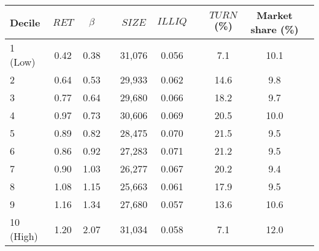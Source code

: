 \begin{tabular}{@{}lccccccccc@{}}
	\toprule
	Decile & $\textit{RET}$ & $\beta$ && $\textit{SIZE}$ & $\textit{ILLIQ}$ && $\textit{TURN}$ (\%) & Market share (\%) \\ \midrule
1 (Low) & 0.42 & 0.38 && 31,076 & 0.056 && 7.1 & 10.1 \\
2       & 0.64 & 0.53 && 29,933 & 0.062 && 14.6 & 9.8 \\
3       & 0.77 & 0.64 && 29,680 & 0.066 && 18.2 & 9.7 \\
4       & 0.97 & 0.73 && 30,606 & 0.069 && 20.5 & 10.0 \\
5       & 0.89 & 0.82 && 28,475 & 0.070 && 21.5 & 9.5 \\
6       & 0.86 & 0.92 && 27,283 & 0.071 && 21.2 & 9.5 \\
7       & 0.90 & 1.03 && 26,277 & 0.067 && 20.2 & 9.4 \\
8       & 1.08 & 1.15 && 25,663 & 0.061 && 17.9 & 9.5 \\
9       & 1.16 & 1.34 && 27,680 & 0.057 && 13.6 & 10.6 \\
10 (High) & 1.20 & 2.07 && 31,034 & 0.058 && 7.1 & 12.0 \\
	\bottomrule
\end{tabular}